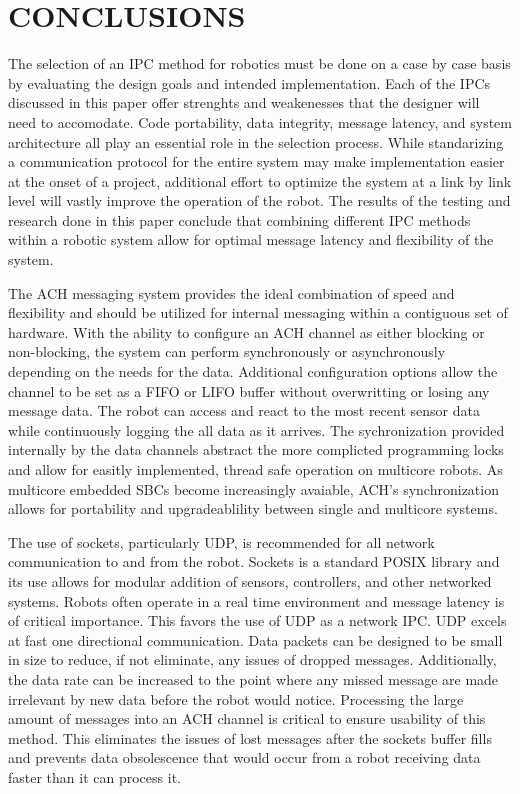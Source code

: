 \section{CONCLUSIONS}

The selection of an IPC method for robotics must be done on a case by case basis by evaluating the design goals and intended implementation. Each of the IPCs discussed in this paper offer strenghts and weakenesses that the designer will need to accomodate. Code portability, data integrity, message latency, and system architecture all play an essential role in the selection process. While standarizing a communication protocol for the entire system may make implementation easier at the onset of a project, additional effort to optimize the system at a link by link level will vastly improve the operation of the robot. The results of the testing and research done in this paper conclude that combining different IPC methods within a robotic system allow for optimal message latency and flexibility of the system.

The ACH messaging system provides the ideal combination of speed and flexibility and should be utilized for internal messaging within a contiguous set of hardware. With the ability to configure an ACH channel as either blocking or non-blocking, the system can perform synchronously or asynchronously depending on the needs for the data. Additional configuration options allow the channel to be set as a FIFO or LIFO buffer without overwritting or losing any message data. The robot can access and react to the most recent sensor data while continuously logging the all data as it arrives. The sychronization provided internally by the data channels abstract the more complicted programming locks and allow for easitly implemented, thread safe operation on multicore robots. As multicore embedded SBCs become increasingly avaiable, ACH's synchronization allows for portability and upgradeablility between single and multicore systems.

The use of sockets, particularly UDP, is recommended for all network communication to and from the robot. Sockets is a standard POSIX library and its use allows for modular addition of sensors, controllers, and other networked systems. Robots often operate in a real time environment and message latency is of critical importance. This favors the use of UDP as a network IPC. UDP excels at fast one directional communication. Data packets can be designed to be small in size to reduce, if not eliminate, any issues of dropped messages. Additionally, the data rate can be increased to the point where any missed message are made irrelevant by new data before the robot would notice. Processing the large amount of messages into an ACH channel is critical to ensure usability of this method. This eliminates the issues of lost messages after the sockets buffer fills and prevents data obsolescence that would occur from a robot receiving data faster than it can process it.

